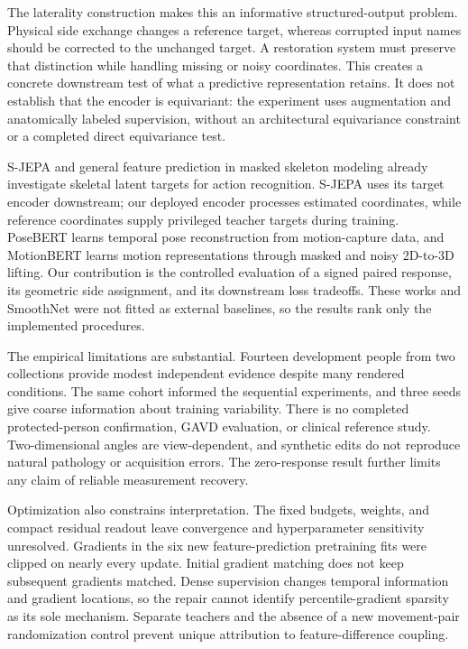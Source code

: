 \documentclass{article}
\begin{document}
The laterality construction makes this an informative structured-output problem. Physical side exchange changes a reference target, whereas corrupted input names should be corrected to the unchanged target. A restoration system must preserve that distinction while handling missing or noisy coordinates. This creates a concrete downstream test of what a predictive representation retains. It does not establish that the encoder is equivariant: the experiment uses augmentation and anatomically labeled supervision, without an architectural equivariance constraint or a completed direct equivariance test.

S-JEPA \citep{abdelfattah2024sjepa} and general feature prediction in masked skeleton modeling \citep{sun2025gfp} already investigate skeletal latent targets for action recognition. S-JEPA uses its target encoder downstream; our deployed encoder processes estimated coordinates, while reference coordinates supply privileged teacher targets during training. PoseBERT \citep{baradel2022posebert} learns temporal pose reconstruction from motion-capture data, and MotionBERT \citep{zhu2023motionbert} learns motion representations through masked and noisy 2D-to-3D lifting. Our contribution is the controlled evaluation of a signed paired response, its geometric side assignment, and its downstream loss tradeoffs. These works and SmoothNet were not fitted as external baselines, so the results rank only the implemented procedures.

The empirical limitations are substantial. Fourteen development people from two collections provide modest independent evidence despite many rendered conditions. The same cohort informed the sequential experiments, and three seeds give coarse information about training variability. There is no completed protected-person confirmation, GAVD evaluation, or clinical reference study. Two-dimensional angles are view-dependent, and synthetic edits do not reproduce natural pathology or acquisition errors. The zero-response result further limits any claim of reliable measurement recovery.

Optimization also constrains interpretation. The fixed budgets, weights, and compact residual readout leave convergence and hyperparameter sensitivity unresolved. Gradients in the six new feature-prediction pretraining fits were clipped on nearly every update. Initial gradient matching does not keep subsequent gradients matched. Dense supervision changes temporal information and gradient locations, so the repair cannot identify percentile-gradient sparsity as its sole mechanism. Separate teachers and the absence of a new movement-pair randomization control prevent unique attribution to feature-difference coupling.
\end{document}
